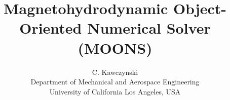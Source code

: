 \documentclass[11pt]{article}
\begin{document}
\doublespacing
\title{Magnetohydrodynamic Object-Oriented Numerical Solver (MOONS)}
\author{C. Kawczynski \\
Department of Mechanical and Aerospace Engineering \\
University of California Los Angeles, USA\\
}
\maketitle

\begin{equation}\end{equation}
\end{document}
